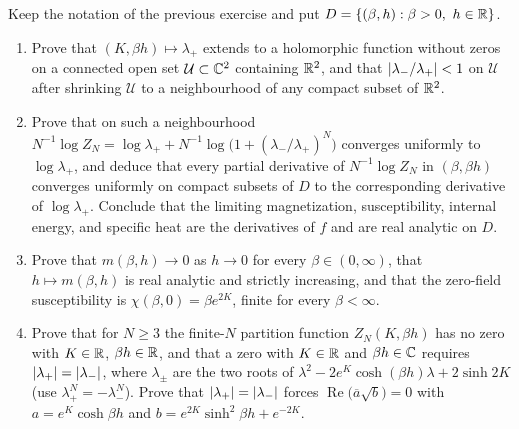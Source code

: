 \begin{exercise}
Keep the notation of the previous exercise and put $D=\{(\beta,h):\beta>0,\ h\in\mathbb R\}$.
\begin{enumerate}[label=(\alph*)]
\item Prove that $(K,\beta h)\mapsto\lambda_+$ extends to a holomorphic
function without zeros on a connected open set $\mathcal U\subset\mathbb C^2$
containing $\mathbb R^2$, and that $\left\lvert \lambda_-/\lambda_+\right\rvert<1$ on $\mathcal U$
after shrinking $\mathcal U$ to a neighbourhood of any compact subset of
$\mathbb R^2$.
\item Prove that on such a neighbourhood
$N^{-1}\log Z_N=\log\lambda_++N^{-1}\log\bigl(1+(\lambda_-/\lambda_+)^N\bigr)$
converges uniformly to $\log\lambda_+$, and deduce that every partial
derivative of $N^{-1}\log Z_N$ in $(\beta,\beta h)$ converges uniformly on
compact subsets of $D$ to the corresponding derivative of $\log\lambda_+$.
Conclude that the limiting magnetization, susceptibility, internal energy,
and specific heat are the derivatives of $f$ and are real analytic on $D$.
\item Prove that $m(\beta,h)\to0$ as $h\to0$ for every $\beta\in(0,\infty)$,
that $h\mapsto m(\beta,h)$ is real analytic and strictly increasing, and that
the zero-field susceptibility is $\chi(\beta,0)=\beta e^{2K}$, finite for every
$\beta<\infty$.
\item Prove that for $N\ge3$ the finite-$N$ partition function
$Z_N(K,\beta h)$ has no zero with $K\in\mathbb R$, $\beta h\in\mathbb R$, and that a zero
with $K\in\mathbb R$ and $\beta h\in\mathbb C$ requires $\left\lvert \lambda_+\right\rvert=\left\lvert \lambda_-\right\rvert$,
where $\lambda_\pm$ are the two roots of $\lambda^2-2e^K\cosh(\beta h)\lambda+2\sinh2K$
(use $\lambda_+^N=-\lambda_-^N$).  Prove that
$\left\lvert \lambda_+\right\rvert=\left\lvert \lambda_-\right\rvert$ forces $\operatorname{Re}\bigl(\overline{a}\sqrt b\bigr)=0$
with $a=e^K\cosh\beta h$ and $b=e^{2K}\sinh^2\beta h+e^{-2K}$.
\end{enumerate}
\end{exercise}

